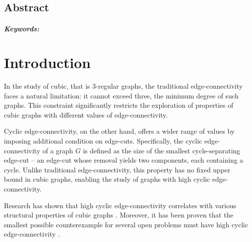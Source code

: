 \documentclass[12pt, twoside]{book}
\begin{document}
\newpage

\begin{otherlanguage}{USenglish}
    \section*{Abstract}

    \thesisabstracten{}

    \paragraph*{Keywords:} \thesiskeywordsen{}
\end{otherlanguage}

\newpage
\tableofcontents

\newpage
\listoffigures

\mainmatter{}

\chapter*{Introduction}

In the study of cubic, that is 3-regular graphs, the traditional edge-connectivity faces a natural limitation: it cannot exceed three, the minimum degree of such graphs. This constraint significantly restricts the exploration of properties of cubic graphs with different values of edge-connectivity.

Cyclic edge-connectivity, on the other hand, offers a wider range of values by imposing additional condition on edge-cuts. Specifically, the cyclic edge-connectivity of a graph $G$ is defined as the size of the smallest cycle-separating edge-cut -- an edge-cut whose removal yields two components, each containing a cycle. Unlike traditional edge-connectivity, this property has no fixed upper bound in cubic graphs, enabling the study of graphs with high cyclic edge-connectivity.

Research has shown that high cyclic \mbox{edge-connectivity} correlates with various structural properties of cubic graphs \cite{Doslic2003, McCuaig1992, Andersen1988, Thomassen1983}. Moreover, it has been proven that the smallest possible counterexample for several open problems must have high cyclic edge-connectivity \cite{Macajova2020, Kochol2004}.

\end{document}
